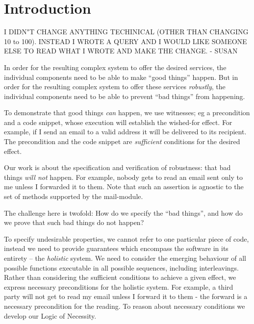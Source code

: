  \newcommand{\prg}[1]{{\texttt{#1}}}
 \section{Introduction}
I DIDN"T CHANGE ANYTHING TECHINICAL (OTHER THAN CHANGING 10 to 100). INSTEAD I WROTE A QUERY AND I WOULD LIKE SOMEONE ELSE TO READ WHAT I WROTE AND MAKE THE CHANGE. - SUSAN
  
{}
In order for the resulting complex system to offer the
desired services, the individual components 
need to  be able to make ``good things''   happen.
But in order for the resulting  complex system
 to offer these services \emph{robustly},  the individual components 
 need to be able to prevent ``bad things'' from happening. 

To demonstrate that  good things \emph{can} happen, we use witnesses;
eg  a precondition and a code snippet, whose execution will establish the
wished-for effect.  For example, if I send an email to a valid address it will
be delivered to its recipient. The precondition and the code snippet
are \emph{sufficient} conditions for the desired effect. 

Our work is about the specification and verification of robustness: that bad things \emph{will 
not} happen. For example, nobody gets to read an email sent only to me unless I forwarded it to them.   
Note that such an assertion is agnostic to the set of methods supported by the mail-module.

The challenge here is twofold: How do we specify the ``bad things'',
 and how do we prove that such bad things do not happen? 

To specify undesirable properties, we cannot refer to one particular piece of code, instead we need to provide guarantees which encompass the software in its entirety -- the \emph{holistic} system. We need to consider the emerging behaviour of all possible functions executable in all possible sequences, including interleavings. Rather than considering the sufficient conditions to achieve a given effect, we express necessary preconditions for the holistic system. For example, a third party will not get to read my email unless I forward it to them - the forward is a necessary precondition for the reading. To reason about necessary conditions we develop our Logic of Necessity.

